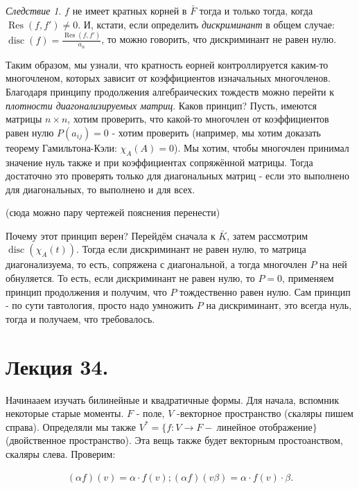 \documentclass[a4paper,100pt]{article}
\theoremstyle{indented}
\theoremstyle{definition}
\theoremstyle{remark}
\newtheorem{cons}{Следствие}
\DeclareMathOperator{\Res}{Res}
\DeclareMathOperator{\disc}{disc}
\begin{document}
\begin{cons}
    $f$ не имеет кратных корней в $\bar{F}$ тогда и только тогда, когда $\Res(f, f')\neq 0$. И, кстати, если определить \textit{дискриминант} в общем случае: $\disc(f)=\frac{\Res(f, f')}{a_n}$, то можно говорить, что дискриминант не равен нулю.
\end{cons}

Таким образом, мы узнали, что кратность еорней контроллируется каким-то многочленом, которых зависит от коэффициентов изначальных многочленов. Благодаря принципу продолжения алгебраических тождеств можно перейти к \textit{плотности диагонализируемых матриц}. Каков принцип? Пусть, имеются матрицы $n\times n$, хотим проверить, что какой-то многочлен от коэффициентов равен нулю $P(a_{ij})=0$ - хотим проверить (например, мы хотим доказать теорему Гамильтона-Кэли: $\chi_A(A)=0$). Мы хотим, чтобы многочлен принимал значение нуль также и при коэффициентах сопряжённой матрицы. Тогда достаточно это проверять только для диагональных матриц - если это выполнено для диагональных, то выполнено и для всех. \ 

(сюда можно пару чертежей пояснения перенести)\ 

Почему этот принцип верен? Перейдём сначала к $\bar{K}$, затем рассмотрим $\disc(\chi_A(t))$. Тогда если дискриминант не равен нулю, то матрица диагонализуема, то есть, сопряжена с диагональной, а тогда многочлен $P$ на ней обнуляется. То есть, если дискриминант не равен нулю, то $P=0$, применяем принцип продолжения и получим, что $P$ тождественно равен нулю. Сам принцип - по сути тавтология, просто надо умножить $P$ на дискриминант, это всегда нуль, тогда и получаем, что требовалось.

\section{Лекция 34.}

Начинааем изучать билинейные и квадратичные формы. Для начала, вспомник некоторые старые моменты. $F$ - поле, $V$ -векторное пространство (скаляры пишем справа). Определяли мы также $V^*=\{f:V\rightarrow F - \: \text{линейное отображение}\}$ (двойственное пространство). Эта вещь также будет векторным простоанством, скаляры слева. Проверим: 

\begin{equation*}
    \begin{aligned}
        (\alpha f)(v)=\alpha\cdot f(v); 
        (\alpha f)(v\beta)=\alpha\cdot f(v)\cdot \beta.
    \end{aligned}
\end{equation*}
\end{document}
